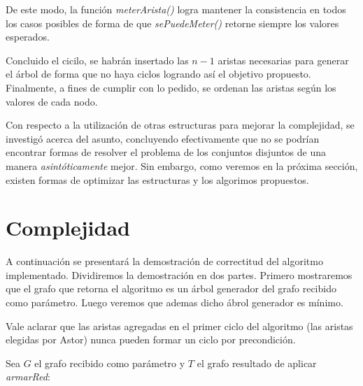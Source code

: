 \documentclass[a4paper,11pt] {article}
\begin{document}
De este modo, la función \textit{meterArista()} logra mantener la consistencia en todos los casos posibles de forma de que \textit{sePuedeMeter()} retorne siempre los valores esperados.

Concluido el cicilo, se habrán insertado las $n-1$ aristas necesarias para generar el árbol de forma que no haya ciclos logrando así el objetivo propuesto. Finalmente, a fines de cumplir con lo pedido, se ordenan las aristas según los valores de cada nodo.

Con respecto a la utilización de otras estructuras para mejorar la complejidad, se investigó acerca del asunto, concluyendo efectivamente que no se podrían encontrar formas de resolver el problema de los conjuntos disjuntos de una manera \textit{asintóticamente} mejor. Sin embargo, como veremos en la próxima sección, existen formas de optimizar las estructuras y los algorimos propuestos.

\section*{Complejidad}

A continuaci\'on se presentar\'a la demostraci\'on de correctitud del algoritmo implementado. Dividiremos la demostraci\'on en dos partes. Primero mostraremos que el grafo que retorna el algoritmo es un \'arbol generador del grafo recibido como par\'ametro. Luego veremos que ademas dicho \'abrol generador es m\'inimo.

Vale aclarar que las aristas agregadas en el primer ciclo del algoritmo (las aristas elegidas por Astor) nunca pueden formar un ciclo por precondici\'on.

Sea $G$ el grafo recibido como par\'ametro y $T$ el grafo resultado de aplicar \textit{armarRed}:
\end{document}
